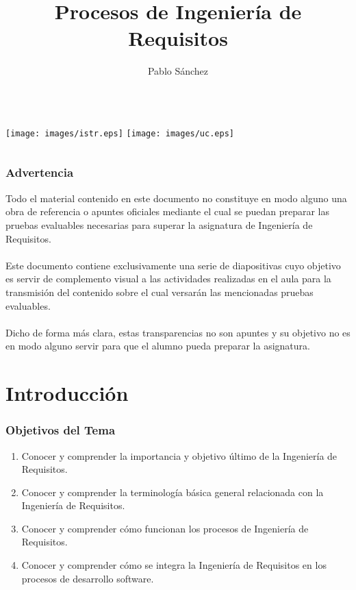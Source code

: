 \documentclass[a4paper,slidestop,xcolor=pst,dvips,blue]{beamer}
\title[Procesos Ing. Requisitos]{Procesos de Ingeniería de Requisitos}
\author[Pablo Sánchez]{\alert{Pablo Sánchez}}
\institute[I2E]{
		   Dpto. Ingeniería Informática y Electrónica \\
		   Universidad de Cantabria \\
		   Santander (Cantabria, España) \\
		   \texttt{p.sanchez@unican.es}
}
\date{}
\begin{document}
\begin{frame}[c]
	\titlepage
	\begin{columns}
			\centering
			\texttt{[image: images/istr.eps]}
			\centering
			\texttt{[image: images/uc.eps]}
    \end{columns}
\end{frame}

\begin{frame}[c]
    \frametitle{\alert{Advertencia}}
    \begin{center}
        Todo el material contenido en este documento  no constituye en modo alguno una obra de referencia o apuntes oficiales mediante el cual se puedan preparar las pruebas evaluables necesarias para superar la asignatura de Ingeniería de Requisitos. \ \\
        \ \\
        Este documento contiene exclusivamente una serie de diapositivas cuyo objetivo es servir de complemento visual a las actividades realizadas en el aula para la transmisión del contenido sobre el cual versarán las mencionadas pruebas evaluables.  \ \\
        \ \\
        Dicho de forma más clara, \alert{estas transparencias no son apuntes y su objetivo no es en modo alguno servir para que el alumno pueda preparar la asignatura.}
    \end{center}
\end{frame}

\section{Introducción}

\begin{frame}[c]
    \frametitle{Objetivos del Tema}
    \begin{enumerate}[<+->]
         \item Conocer y comprender la importancia y objetivo último de la Ingeniería de Requisitos.
         \item Conocer y comprender la terminología básica general relacionada con la Ingeniería de Requisitos.
         \item Conocer y comprender cómo funcionan los procesos de Ingeniería de Requisitos.
         \item Conocer y comprender cómo se integra la Ingeniería de Requisitos en los procesos de desarrollo software.
    \end{enumerate}
\end{frame}
\end{document}
